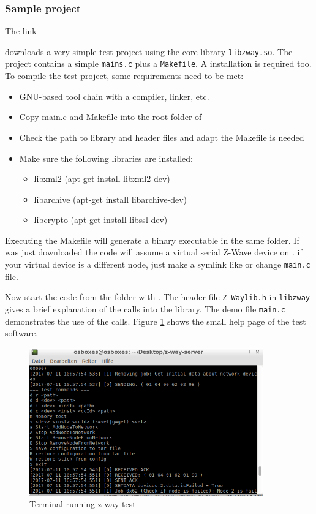 \subsubsection{Sample project}

The link

downloads a very simple test project using the \zway core library \texttt{libzway.so}. 
The project contains a simple \texttt{mains.c} plus a \texttt{Makefile}. A \zway installation is required 
too. To compile the test project, some requirements need to be met:
\begin {itemize}
\item GNU-based tool chain with a compiler, linker, etc.
\item Copy main.c and Makefile into the root folder of \zway
\item Check the path to library and header files and adapt the Makefile is needed
\item Make sure the following libraries are installed:
\begin {itemize}
\item libxml2 (apt-get install libxml2-dev)
\item libarchive (apt-get install libarchive-dev)
\item libcrypto (apt-get install libssl-dev)
\end {itemize}
\end {itemize}

Executing the Makefile will generate a binary executable  in the same 
folder. If \zway was just downloaded the code will assume a virtual serial Z-Wave device 
on . if your virtual device is a different node, just make a 
symlink like  or change \texttt{main.c} file.

Now start the code from the folder with . 
The header file \texttt{Z-Waylib.h} in \texttt{libzway} gives a brief explanation of the calls 
into the library. The demo file \texttt{main.c} demonstrates the use of the calls. 
Figure \ref{libterminal} shows the small help page of the test software.

\begin{figure}
\begin{center}
\includegraphics[width=0.9\textwidth]{pngs/cap11/libterminal.png}
\caption{Terminal running z-way-test}
\label{libterminal}
\end{center}
\end{figure}
